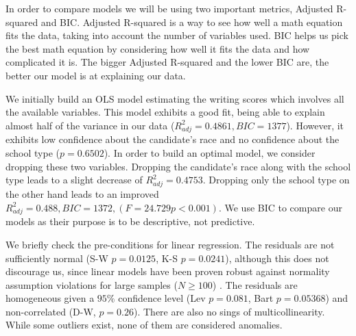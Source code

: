 \documentclass[10pt, a4paper]{article}
\begin{document}
	In order to compare models we will be using two important metrics, Adjusted R-squared and BIC. Adjusted R-squared is a way to see how well a math equation fits the data, taking into account the number of variables used. BIC helps us pick the best math equation by considering how well it fits the data and how complicated it is. The bigger Adjusted R-squared and the lower BIC are, the better our model is at explaining our data.
	
	We initially build an OLS model estimating the writing scores which involves all the available variables. This model exhibits a good fit, being able to explain almost half of the variance in our data ($R^2_{adj} = 0.4861, BIC=1377$). However, it exhibits low confidence about the candidate's race and no confidence about the school type ($p=0.6502$). In order to build an optimal model, we consider dropping these two variables. Dropping the candidate's race along with the school type leads to a slight decrease of $R^2_{adj} = 0.4753$. Dropping only the school type on the other hand leads to an improved $R^2_{adj} = 0.488, BIC=1372, (F= 24.729 p<0.001)$. We use BIC to compare our models as their purpose is to be descriptive, not predictive.
	
	We briefly check the pre-conditions for linear regression. The residuals are not sufficiently normal (S-W $p = 0.0125$, K-S $p=0.0241$), although this does not discourage us, since linear models have been proven robust against normality assumption violations for large samples ($N\geq 100$) \cite{ols_linear}. The residuals are homogeneous given a $95\%$ confidence level (Lev $p = 0.081$, Bart $p = 0.05368$) and non-correlated (D-W, $p=0.26$). There are also no sings of multicollinearity. While some outliers exist, none of them are considered anomalies.
	
\end{document}
